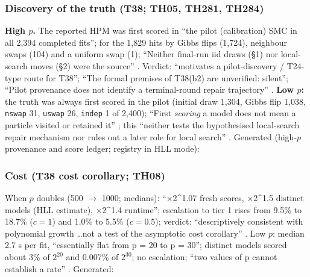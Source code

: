 \subsubsection{Discovery of the truth (T38; TH05, TH281, TH284)}
\textbf{High $p$.} The reported HPM was first scored in ``the pilot (calibration) SMC in all 2,394 completed fits''; for the 1,829 hits by
Gibbs flips (1,724), neighbour swaps (104) and a uniform swap (1); ``Neither final-run iid draws (§1) nor local-search moves (§2) were the
source'' . Verdict: ``motivates a pilot-discovery / T24-type route
for T38''; ``The formal premises of T38(b2) are unverified: silent''; ``Pilot provenance does not identify a terminal-round repair
trajectory'' . \textbf{Low $p$:} the truth was always first scored
in the pilot (initial draw 1,304, Gibbs flip 1,038, \texttt{nswap} 31, \texttt{uswap} 26, \texttt{indep} 1 of 2,400); ``First
\emph{scoring} a model does not mean a particle visited or retained it'' ;
this ``neither tests the hypothesised local-search repair mechanism nor rules out a later role for local search''
. Generated (high-$p$ provenance and score ledger; registry in HLL mode):


\subsubsection{Cost (T38 cost corollary; TH08)}
When $p$ doubles (500 $\to$ 1000; medians): ``×2\textasciicircum1.07 fresh scores, ×2\textasciicircum1.5 distinct models (HLL estimate),
×2\textasciicircum1.4 runtime''; escalation to tier 1 rises from 9.5\% to 18.7\% ($c=1$) and 1.0\% to 5.5\% ($c=0.5$); verdict:
``descriptively consistent with polynomial growth \dots not a test of the asymptotic cost corollary''
. Low $p$: median 2.7 s per fit, ``essentially flat from p = 20 to
p = 30''; distinct models scored about 3\% of $2^{20}$ and 0.007\% of $2^{30}$; no escalation; ``two values of p cannot establish a rate''
. Generated:


